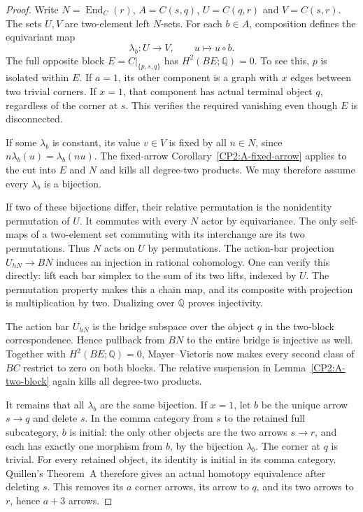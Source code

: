 \begin{proof}
Write $N=\operatorname{End}_C(r)$,
$A=C(s,q)$, $U=C(q,r)$ and $V=C(s,r)$.
The sets $U,V$ are two-element left $N$-sets.
For each $b\in A$, composition defines the equivariant
map
\[
 \lambda_b:U\longrightarrow V,
 \qquad u\longmapsto u\circ b.
\]
The full opposite block $E=C|_{\{p,s,q\}}$ has
$H^2(BE;\mathbb Q)=0$. To see this, $p$ is isolated
within $E$. If $a=1$, its other component is a graph
with $x$ edges between two trivial corners. If $x=1$,
that component has actual terminal object $q$, regardless
of the corner at $s$. This verifies the required
vanishing even though $E$ is disconnected.

If some $\lambda_b$ is constant, its value $v\in V$
is fixed by all $n\in N$, since
$n\lambda_b(u)=\lambda_b(nu)$. The fixed-arrow
Corollary~\ref{CP2:A-fixed-arrow} applies to the cut
into $E$ and $N$ and kills all degree-two products.
We may therefore assume every $\lambda_b$ is a bijection.

If two of these bijections differ, their relative
permutation is the nonidentity permutation of $U$.
It commutes with every $N$ actor by equivariance.
The only self-maps of a two-element set commuting with
its interchange are its two permutations. Thus $N$
acts on $U$ by permutations. The action-bar projection
$U_{hN}\to BN$ induces an injection in rational
cohomology. One can verify this directly: lift each
bar simplex to the sum of its two lifts, indexed by
$U$. The permutation property makes this a chain map,
and its composite with projection is multiplication
by two. Dualizing over $\mathbb Q$ proves injectivity.

The action bar $U_{hN}$ is the bridge subspace over the
object $q$ in the two-block correspondence. Hence
pullback from $BN$ to the entire bridge is injective
as well. Together with $H^2(BE;\mathbb Q)=0$,
Mayer--Vietoris now makes every second class of $BC$
restrict to zero on both blocks. The relative
suspension in Lemma~\ref{CP2:A-two-block} again kills
all degree-two products.

It remains that all $\lambda_b$ are the same bijection.
If $x=1$, let $b$ be the unique arrow $s\to q$ and
delete $s$. In the comma category from $s$ to the
retained full subcategory, $b$ is initial: the only
other objects are the two arrows $s\to r$, and each
has exactly one morphism from $b$, by the bijection
$\lambda_b$. The corner at $q$ is trivial. For every
retained object, its identity is initial in its comma
category. Quillen's Theorem~A therefore gives an
actual homotopy equivalence after deleting $s$.
This removes its $a$ corner arrows, its arrow to $q$,
and its two arrows to $r$, hence $a+3$ arrows.


\end{proof}
